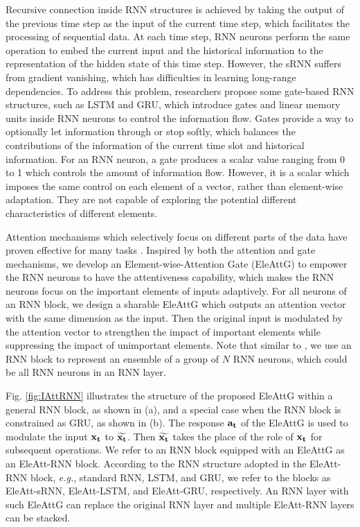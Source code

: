\documentclass[journal]{IEEEtran}
\newcommand{\Outer}{Element-wise}
\newcommand{\EleAttGn}{{EleAttG}}
\begin{document}
Recursive connection inside RNN structures is achieved by taking the output of the previous time step as the input of the current time step, which facilitates the processing of sequential data. At each time step, RNN neurons perform the same operation to embed the current input and the historical information to the representation of the hidden state of this time step. However, the sRNN suffers from gradient vanishing, which has difficulties in learning long-range dependencies. To address this problem, researchers propose some gate-based RNN structures, such as LSTM and GRU, which introduce gates and linear memory units inside RNN neurons to control the information flow. Gates provide a way to optionally let information through or stop softly, which balances the contributions of the information of the current time slot and historical information. For an RNN neuron, a gate produces a scalar value ranging from 0 to 1 which controls the amount of information flow. However, it is a scalar which imposes the same control on each element of a vector, rather than element-wise adaptation. They are not capable of exploring the potential different characteristics of different elements.

Attention mechanisms which selectively focus on different parts of the data have proven effective for many tasks \cite{luong2015effective,vaswani2017attention,xu2015show,li2017attentive,sharma2015actionattention,wang2016hierarchical}. Inspired by both the attention and gate mechanisms, we develop an \Outer-Attention Gate (\EleAttGn) to empower the RNN neurons to have the attentiveness capability, which makes the RNN neurons focus on the important elements of inputs adaptively. For all neurons of an RNN block, we design a sharable {\EleAttGn} which outputs an attention vector with the same dimension as the input. Then the original input is modulated by the attention vector to strengthen the impact of important elements while suppressing the impact of unimportant elements. Note that similar to \cite{LSTMblog}, we use an RNN block to represent an ensemble of a group of $N$ RNN neurons, which could be all RNN neurons in an RNN layer.

Fig. \ref{fig:IAttRNN} illustrates the structure of the proposed {\EleAttGn} within a general RNN block, as shown in (a), and a special case when the RNN block is constrained as GRU, as shown in (b). The response $\bf{a}_t$ of the {\EleAttGn} is used to modulate the input $\bf{x}_t$ to $\widetilde{\bf{x}_t}$. Then $\widetilde{\bf{x}_t}$ takes the place of the role of $\bf{x}_t$ for subsequent operations. We refer to an RNN block equipped with an EleAttG as an EleAtt-RNN block. According to the RNN structure adopted in the EleAtt-RNN block, {\it e.g.}, standard RNN, LSTM, and GRU, we refer to the blocks as EleAtt-sRNN, EleAtt-LSTM, and EleAtt-GRU, respectively. An RNN layer with such EleAttG can replace the original RNN layer and multiple EleAtt-RNN layers can be stacked.
\end{document}
